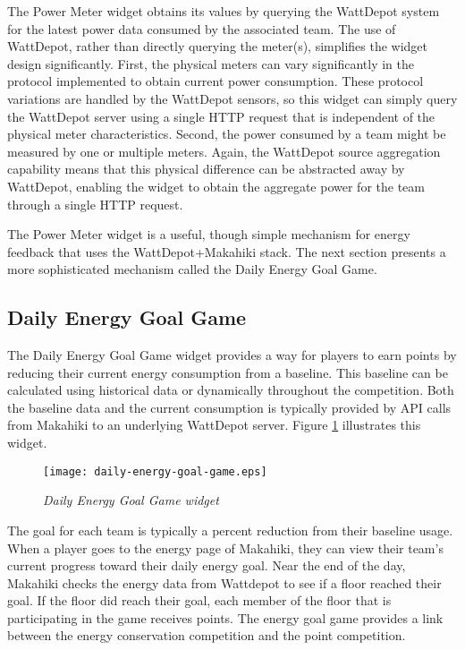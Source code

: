 The Power Meter widget obtains its values by querying the WattDepot system for the latest power data consumed by the associated team.  The use of WattDepot, rather than directly querying the meter(s), simplifies the widget design significantly.  First, the physical meters can vary significantly in the protocol implemented to obtain current power consumption.   These protocol variations are handled by the WattDepot sensors, so this widget can simply query the WattDepot server using a single HTTP request that is independent of the physical meter characteristics.  Second, the power consumed by a team might be measured by one or multiple meters.  Again, the WattDepot source aggregation capability means that this physical difference can be abstracted away by WattDepot, enabling the widget to obtain the aggregate power for the team through a single HTTP request.

The Power Meter widget is a useful, though simple mechanism for energy feedback that uses the WattDepot+Makahiki stack.   The next section presents a more sophisticated mechanism called the Daily Energy Goal Game.

\subsection{Daily Energy Goal Game}

The Daily Energy Goal Game widget provides a way for players to earn points by reducing their current energy consumption from a baseline. This baseline can be calculated using historical data or dynamically throughout the competition. Both the baseline data and the current consumption is typically provided by API calls from Makahiki to an underlying WattDepot server.
Figure \ref{fig:DailyEnergyGoal} illustrates this widget.

\begin{figure}[th]
  \center
  \texttt{[image: daily-energy-goal-game.eps]}
  \caption{\em Daily Energy Goal Game widget}
  \label{fig:DailyEnergyGoal}
\end{figure}

The goal for each team is typically a percent reduction from their baseline usage. When a player goes to the energy page of Makahiki, they can view their team's current progress toward their daily energy goal. Near the end of the day, Makahiki checks the energy data from Wattdepot to see if a floor reached their goal. If the floor did reach their goal, each member of the floor that is participating in the game receives points. The energy goal game provides a link between the energy conservation competition and the point competition.


